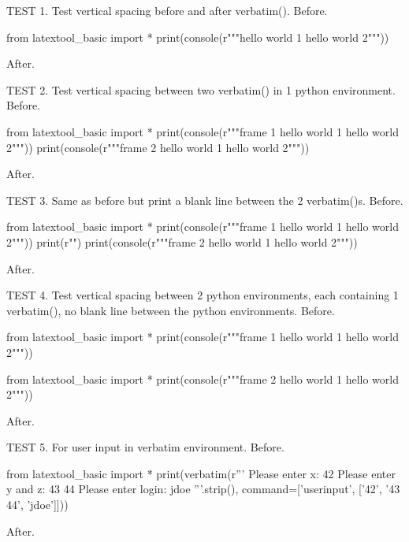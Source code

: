 \newpage

TEST 1. Test vertical spacing before and after verbatim().
Before.
\begin{python}
from latextool_basic import *
print(console(r"""hello world 1
hello world 2"""))
\end{python}
After.

TEST 2. Test vertical spacing between two verbatim() in 1 python environment.
Before.
\begin{python}
from latextool_basic import *
print(console(r"""frame 1
hello world 1
hello world 2"""))
print(console(r"""frame 2
hello world 1
hello world 2"""))
\end{python}
After.

TEST 3. Same as before but print a blank line between the 2 verbatim()s.
Before.
\begin{python}
from latextool_basic import *
print(console(r"""frame 1
hello world 1
hello world 2"""))
print(r"\mbox{}")
print(console(r"""frame 2
hello world 1
hello world 2"""))
\end{python}
After.

TEST 4. Test vertical spacing between 2 python environments, 
each containing 1 verbatim(), no blank line between the python environments.
Before.
\begin{python}
from latextool_basic import *
print(console(r"""frame 1
hello world 1
hello world 2"""))
\end{python}
\begin{python}
from latextool_basic import *
print(console(r"""frame 2
hello world 1
hello world 2"""))
\end{python}
After.


TEST 5. For user input in verbatim environment.
Before.
\begin{python}
from latextool_basic import *
print(verbatim(r'''
Please enter x: 42
Please enter y and z: 43 44
Please enter login: jdoe
'''.strip(), command=['userinput', ['42', '43 44', 'jdoe']]))
\end{python}
After.


